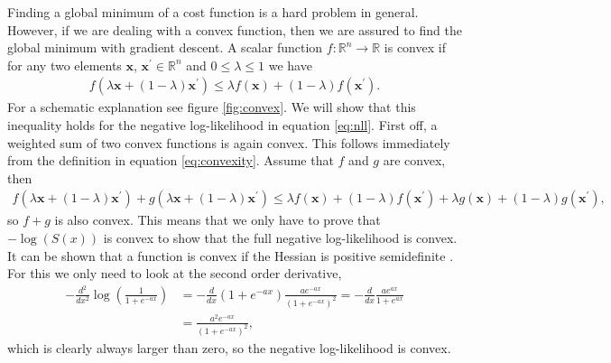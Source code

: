 Finding a global minimum of a cost function is a hard problem in general. However, if we are dealing with a convex function, then we are assured to find the global minimum with gradient descent. A scalar function $f:\mathbb{R}^n \to \mathbb{R} $ is convex if for any two elements $\mathbf{x}$, $\mathbf{x}^\prime\in \mathbb{R}^n$ and $0\leq \lambda \leq 1$ we have
\begin{align}
    f(\lambda \mathbf{x} + (1 - \lambda) \mathbf{x}^\prime) \leq \lambda f(\mathbf{x}) + (1-\lambda) f(\mathbf{x}^\prime) \label{eq:convexity}.
\end{align}
For a schematic explanation see figure \ref{fig:convex}. We will show that this inequality holds for the negative log-likelihood in equation \ref{eq:nll}. First off, a weighted sum of two convex functions is again convex. This follows immediately from the definition in equation \ref{eq:convexity}. Assume that $f$ and $g$ are convex, then
\begin{align*}
    f(\lambda \mathbf{x} + (1 - \lambda) \mathbf{x}^\prime) + g(\lambda \mathbf{x} + (1 - \lambda) \mathbf{x}^\prime)  \leq \lambda f(\mathbf{x}) + (1-\lambda) f(\mathbf{x}^\prime) + \lambda g(\mathbf{x}) + (1-\lambda) g(\mathbf{x}^\prime),
\end{align*}
so $f+g$ is also convex. This means that we only have to prove that $-\log(S(x))$ is convex to show that the full negative log-likelihood is convex. It can be shown that a function is convex if the Hessian is positive semidefinite \cite{Boyd2004}. For this we only need to look at the second order derivative,
\begin{align*}
    -\frac{d^2}{dx^2} \log(\frac{1}{1 + e^{-ax}}) &=-\frac{d}{dx} (1 + e^{-ax}) \frac{a e^{-ax}}{(1 + e^{-ax})^2} =  -\frac{d}{dx} \frac{a e^{ax}}{1 + e^{ax}}\\
    & = \frac{a^2 e^{-ax}}{(1 + e^{-ax})^2},
\end{align*}
which is clearly always larger than zero, so the negative log-likelihood is convex. \newline

